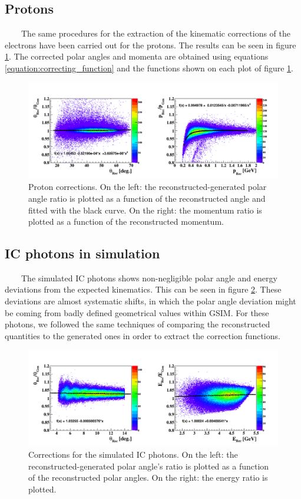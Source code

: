\subsection{Protons}
~~~~The same procedures for the extraction of the kinematic corrections of the electrons have been carried out for the protons. The results can be seen in figure \ref{fig:proton_corrections}. The corrected polar angles and momenta are obtained using equations \ref{equation:correcting_function} and the functions shown on each plot of figure \ref{fig:proton_corrections}. 
\begin{figure}[tp]
\centering
\includegraphics[scale=0.41]{fig_simulation/before_proton_Rec_gen.png}
\caption{Proton corrections. On the left: the reconstructed-generated polar angle ratio is plotted as a function of the reconstructed angle and fitted with the black curve. On the right: the momentum ratio is plotted as a function of the reconstructed momentum.} 
\label{fig:proton_corrections}
\end{figure}


\subsection{IC photons in simulation} 
~~~~The simulated IC photons shows non-negligible polar angle and energy deviations from the expected kinematics. This can be seen in figure \ref{fig:simulated_ic_corrections}. These deviations are almost systematic shifts, in which the polar angle deviation might be coming from badly defined geometrical values within GSIM. For these photons, we followed the same techniques of comparing the reconstructed quantities to the generated ones in order to extract the correction functions.\\

\begin{figure}[tbp]
\centering
\includegraphics[scale=0.41]{fig_simulation/before_gamma_Rec_gen.png}
\caption{Corrections for the simulated IC photons. On the left: the reconstructed-generated polar angle's ratio is plotted as a function of the reconstructed polar angles. On the right: the energy ratio is plotted.} 
\label{fig:simulated_ic_corrections}
\end{figure}

